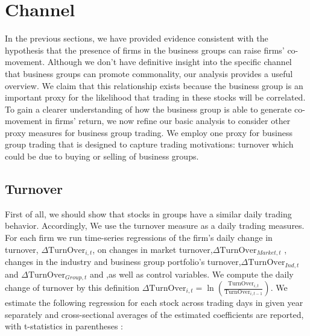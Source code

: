 \section{{Channel} }


	In the previous sections, we have provided evidence consistent with the hypothesis that the presence of firms in the business groups can raise firms' co-movement. Although we don't have definitive insight into the specific channel that business groups can promote commonality, our analysis provides a useful overview.
	We claim that this relationship exists because the business group is an important proxy for the likelihood that trading in these stocks will be correlated. To gain a clearer understanding of how the business group is able to generate co-movement in firms' return, we now refine our basic analysis to consider other proxy measures for business group trading.
	We employ one proxy for business group trading that is designed to capture  trading motivations: turnover which could be due to buying or selling of business groups.
	
	





\subsection{{Turnover}}


	First of all, we should show that stocks in groups have a similar daily trading behavior. Accordingly, We use the turnover measure as a daily trading measures. For each firm we run time-series regressions of the firm's daily change in turnover, $ \Delta \text{TurnOver}_{i,t} $, on changes in market turnover,$ \Delta\text{TurnOver}_{Market,t}   $ , changes in the industry and business group portfolio's turnover,$ \Delta\text{TurnOver}_{Ind,t} $ and  $\Delta \text{TurnOver}_{Group,t} $ and  ,as well as control variables.
We compute the daily change of turnover by this definition $ \Delta \text{TurnOver}_{i,t} = \ln(\frac{\text{TurnOver}_{i,t}}{\text{TurnOver}_{i,t-1}}) $. 
We estimate the following regression for each stock across trading days in given year separately and cross-sectional averages of the estimated coefficients are reported, with t-statistics in parentheses :

